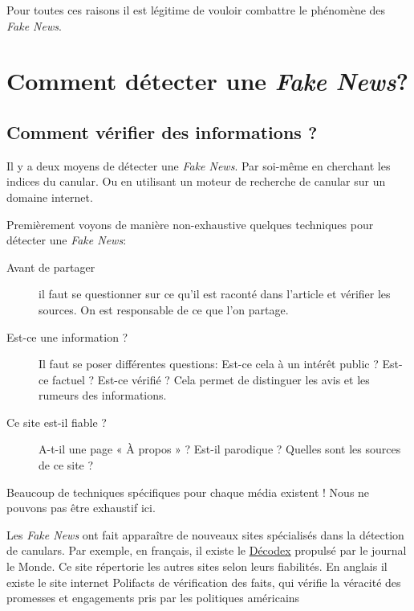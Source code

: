 \documentclass[11pt,a4paper,oldfontcommands]{memoir}
\begin{document}
Pour toutes ces raisons il est légitime de vouloir combattre le phénomène des \textit{Fake News}.


\section{Comment détecter une \textit{Fake News}?}


\subsection{Comment vérifier des informations ?}
Il y a deux moyens de détecter une \textit{Fake News}.
Par soi-même en cherchant les indices du canular.
Ou en utilisant un moteur de recherche de canular sur un domaine internet.

Premièrement voyons de manière non-exhaustive quelques techniques pour détecter une \textit{Fake News}:
\begin{description}
 \item [Avant de partager] il faut se questionner sur ce qu'il est raconté dans l'article et vérifier les sources. On est responsable de ce que l'on partage.
 \item [Est-ce une information ?] Il faut se poser différentes questions: Est-ce cela à un intérêt public ? Est-ce factuel ? Est-ce vérifié ? Cela permet de distinguer les avis et les rumeurs des informations.
 \item [Ce site est-il fiable ?] A-t-il une page « À propos » ? Est-il parodique ? Quelles sont les sources de ce site ?
\end{description}
Beaucoup de techniques spécifiques pour chaque média existent ! Nous ne pouvons pas être exhaustif ici.

Les \textit{Fake News} ont fait apparaître de nouveaux sites spécialisés dans la détection de canulars.
Par exemple, en français, il existe le \href{http://www.lemonde.fr/verification/}{Décodex} propulsé par le journal le Monde. Ce site répertorie les autres sites selon leurs fiabilités.
En anglais il existe le site internet Polifacts de vérification des faits, qui vérifie la véracité des promesses et engagements pris par les politiques américains
\end{document}
